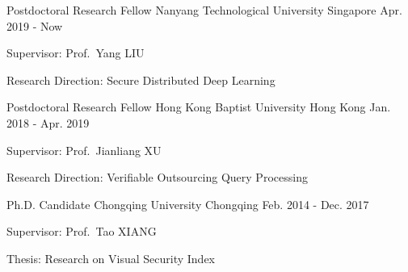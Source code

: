 \documentclass[11pt, a4paper]{awesome-cv}
\begin{document}
\vspace{-0.2cm}
\begin{cventries}
    \cventry%
    {Postdoctoral Research Fellow}
    {Nanyang Technological University}
    {Singapore}
    {Apr. 2019 - Now} %
    {
        \begin{cvitems}
            \item{Supervisor: Prof.\ Yang LIU}
            \item{Research Direction: Secure Distributed Deep Learning}
        \end{cvitems}
    }
    \cventry%
    {Postdoctoral Research Fellow}
    {Hong Kong Baptist University}
    {Hong Kong}
    {Jan. 2018 - Apr. 2019} %
    {
        \begin{cvitems}
            \item{Supervisor: Prof.\ Jianliang XU}
            \item{Research Direction: Verifiable Outsourcing Query Processing}
        \end{cvitems}
    }
	\cventry%
	{Ph.D. Candidate}
	{Chongqing University}
	{Chongqing}
	{Feb. 2014 - Dec. 2017} %
	{
		\begin{cvitems}
			\item{Supervisor: Prof.\ Tao XIANG}
			\item{Thesis: Research on Visual Security Index}
		\end{cvitems}
	}
\end{cventries}

\begin{cvparagraph}
    \nocite{*}
    \printbibliography[heading=none]
\end{cvparagraph}

\newpage
{}
\begin{cvawards}
\end{cvawards}

\begin{description}
    \item[] 
    \item[] 
    \item[] 
\end{description}
\end{document}
